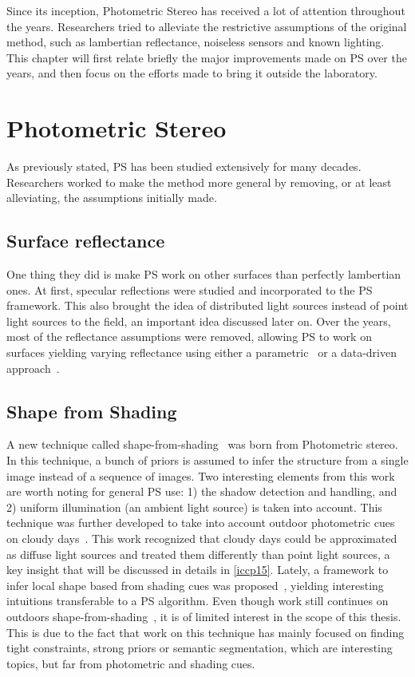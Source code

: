 \documentclass{report}
\begin{document}
Since its inception, Photometric Stereo has received a lot of attention throughout the years. Researchers tried to alleviate the restrictive assumptions of the original method, such as lambertian reflectance, noiseless sensors and known lighting. This chapter will first relate briefly the major improvements made on PS over the years, and then focus on the efforts made to bring it outside the laboratory.


\section{Photometric Stereo}

As previously stated, PS has been studied extensively for many decades. Researchers worked to make the method more general by removing, or at least alleviating, the assumptions initially made.

\subsection{Surface reflectance}
One thing they did is make PS work on other surfaces than perfectly lambertian ones. At first, specular reflections \cite{Ikeuchi1981} were studied and incorporated to the PS framework. This also brought the idea of distributed light sources instead of point light sources to the field, an important idea discussed later on. Over the years, most of the reflectance assumptions were removed, allowing PS to work on surfaces yielding varying reflectance using either a parametric~\cite{hertzmann-pami-05,goldman-tpami-10} or a data-driven approach~\cite{alldrin-cvpr-08}.

\subsection{Shape from Shading}
A new technique called shape-from-shading~\cite{Horn1989} was born from Photometric stereo. In this technique, a bunch of priors is assumed to infer the structure from a single image instead of a sequence of images. Two interesting elements from this work are worth noting for general PS use: 1) the shadow detection and handling, and 2) uniform illumination (an ambient light source) is taken into account. This technique was further developed to take into account outdoor photometric cues on cloudy days~\cite{Langer1994}. This work recognized that cloudy days could be approximated as diffuse light sources and treated them differently than point light sources, a key insight that will be discussed in details in \ref{iccp15}. Lately, a framework to infer local shape based from shading cues was proposed~\cite{Xiong2013}, yielding interesting intuitions transferable to a PS algorithm. Even though work still continues on outdoors shape-from-shading~\cite{oxholm-eccv-12,johnson-cvpr-11,barron-pami-15}, it is of limited interest in the scope of this thesis. This is due to the fact that work on this technique has mainly focused on finding tight constraints, strong priors or semantic segmentation, which are interesting topics, but far from photometric and shading cues.
\end{document}
